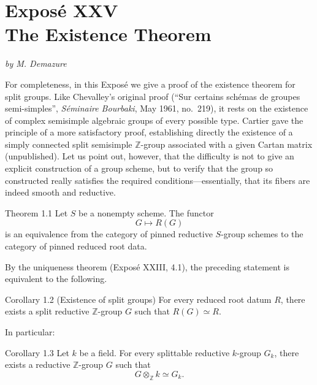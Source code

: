 \chapter*{Exposé XXV\\The Existence Theorem}
\begin{center}
\textit{by M. Demazure}
\end{center}

For completeness, in this Exposé we give a proof of the existence theorem for split
groups. Like Chevalley's original proof (``Sur certains schémas de groupes
semi-simples'', \textit{Séminaire Bourbaki}, May 1961, no.~219), it rests on the
existence of complex semisimple algebraic groups of every possible type. Cartier
gave the principle of a more satisfactory proof, establishing directly the
existence of a simply connected split semisimple \(\mathbb Z\)-group associated
with a given Cartan matrix (unpublished).
Let us point out, however, that the difficulty is not to give an explicit
construction of a group scheme, but to verify that the group so constructed
really satisfies the required conditions---essentially, that its fibers are
indeed smooth and reductive.


\begin{sgastatement}{Theorem 1.1}
Let \(S\) be a nonempty scheme. The functor
\[
  G\longmapsto R(G)
\]
is an equivalence from the category of pinned reductive \(S\)-group schemes to
the category of pinned reduced root data.
\end{sgastatement}

By the uniqueness theorem (Exposé XXIII, 4.1), the preceding statement is
equivalent to the following.

\begin{sgastatement}{Corollary 1.2 (Existence of split groups)}
For every reduced root datum \(R\), there exists a split reductive
\(\mathbb Z\)-group \(G\) such that \(R(G)\simeq R\).
\end{sgastatement}

In particular:

\begin{sgastatement}{Corollary 1.3}
Let \(k\) be a field. For every splittable reductive \(k\)-group \(G_k\), there
exists a reductive \(\mathbb Z\)-group \(G\) such that
\[
  G\otimes_{\mathbb Z}k\simeq G_k.
\]
\end{sgastatement}

